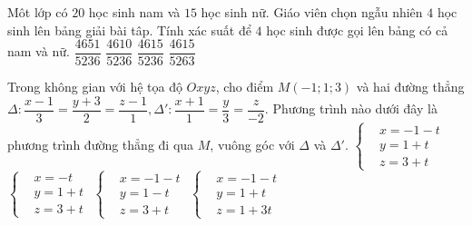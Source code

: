 \begin{ex}%
	Môt lớp có $20$ học sinh nam và $15$ học sinh nữ. Giáo viên chọn ngẫu nhiên $4$ học sinh lên bảng giải bài tâp. Tính xác suất để $4$ học sinh được gọi lên bảng có cả nam và nữ. 
	\choice
	{$\dfrac{4651}{5236}$	}
	{$\dfrac{4610}{5236}$	}
	{\True $\dfrac{4615}{5236}$	}
	{$\dfrac{4615}{5263}$}
\end{ex}
\begin{ex}%
	Trong không gian với hệ tọa độ $Oxyz$, cho điểm $M(-1;1;3)$ và hai đường thẳng \break$\Delta\colon\dfrac{x-1}{3}=\dfrac{y+3}{2}=\dfrac{z-1}{1}, \Delta '\colon\dfrac{x+1}{1}=\dfrac{y}{3}=\dfrac{z}{-2}$. Phương trình nào dưới đây là phương trình đường thẳng đi qua $M$, vuông góc với $\Delta $ và $\Delta '$. 
	\choice
	{\True $\left\{\begin{aligned}& x=-1-t \\
		& y=1+t \\
		& z=3+t 
		\end{aligned}\right.$	}
	{$\left\{\begin{aligned}& x=-t \\
		& y=1+t \\
		& z=3+t 
		\end{aligned}\right.$	}
	{$\left\{\begin{aligned}& x=-1-t \\
		& y=1-t \\
		& z=3+t 
		\end{aligned}\right.$	}
	{$\left\{\begin{aligned}& x=-1-t \\
		& y=1+t \\
		& z=1+3t 
		\end{aligned}\right.$}
\end{ex}
